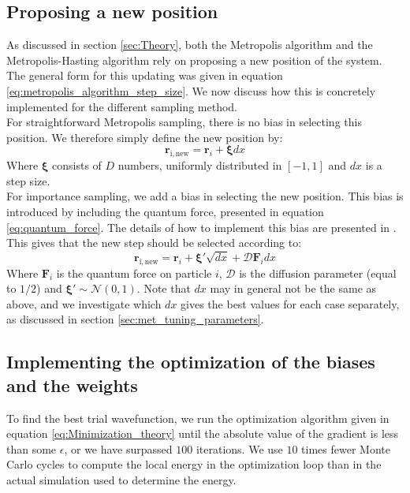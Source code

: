 \documentclass[a4paper, 10pt]{article}
\begin{document}
	\subsection{Proposing a new position}\label{sec:met_propose_new_position}
	As discussed in section \ref{sec:Theory}, both the Metropolis algorithm and the Metropolis-Hasting algorithm rely on proposing a new position of the system. The general form for this updating was given in equation \ref{eq:metropolis_algorithm_step_size}. We now discuss how this is concretely implemented for the different sampling method.\\
	\linebreak
	For straightforward Metropolis sampling, there is no bias in selecting this position. We therefore simply define the new position by:
	\begin{equation}
	\boldsymbol{r}_{\mathrm{i,new}}=\boldsymbol{r}_i+\boldsymbol{\xi}dx
	\end{equation}
	Where $\boldsymbol{\xi}$ consists of $D$ numbers, uniformly distributed in $[-1,1]$ and $dx$ is a step size.\\
	\linebreak
	For importance sampling, we add a bias in selecting the new position. This bias is introduced by including the quantum force, presented in equation \ref{eq:quantum_force}. The details of how to implement this bias are presented in \cite{Hjorth-Jensen2015}. This gives that the new step should be selected according to:
	\begin{equation}
	\boldsymbol{r}_{\mathrm{i,new}}=\boldsymbol{r}_i+\boldsymbol{\xi'}\sqrt{dx}+\mathcal{D}\boldsymbol{F}_i dx
	\end{equation}
	Where $\boldsymbol{F}_i$ is the quantum force on particle $i$, $\mathcal{D}$ is the diffusion parameter (equal to $1/2$) and $\boldsymbol{\xi'}\sim \mathcal{N}(0,1)$. Note that $dx$ may in general not be the same as above, and we investigate which $dx$ gives the best values for each case separately, as discussed in section \ref{sec:met_tuning_parameters}.
	\subsection{Implementing the optimization of the biases and the weights}
	To find the best trial wavefunction, we run the optimization algorithm given in equation \ref{eq:Minimization_theory} until the absolute value of the gradient is less than some $\epsilon$, or we have surpassed $100$ iterations. We use $10$ times fewer Monte Carlo cycles to compute the local energy in the optimization loop than in the actual simulation used to determine the energy.
\end{document}
